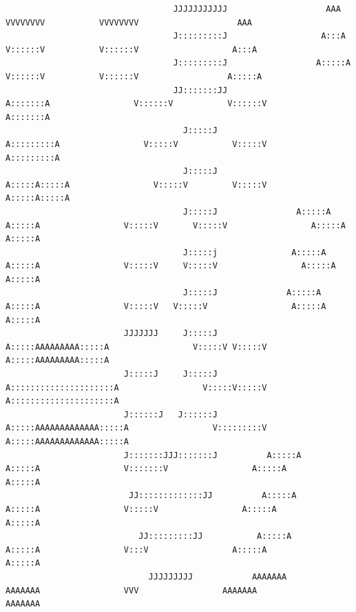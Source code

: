 \documentclass[openany]{book}  %
\begin{document}
\begin{titlepage}
{\begin{verbatim}
                                  JJJJJJJJJJJ                    AAA                    VVVVVVVV           VVVVVVVV                    AAA               
                                  J:::::::::J                   A:::A                   V::::::V           V::::::V                   A:::A              
                                  J:::::::::J                  A:::::A                  V::::::V           V::::::V                  A:::::A             
                                  JJ:::::::JJ                 A:::::::A                 V::::::V           V::::::V                 A:::::::A            
                                    J:::::J                  A:::::::::A                 V:::::V           V:::::V                 A:::::::::A           
                                    J:::::J                 A:::::A:::::A                 V:::::V         V:::::V                 A:::::A:::::A          
                                    J:::::J                A:::::A A:::::A                 V:::::V       V:::::V                 A:::::A A:::::A         
                                    J:::::j               A:::::A   A:::::A                 V:::::V     V:::::V                 A:::::A   A:::::A        
                                    J:::::J              A:::::A     A:::::A                 V:::::V   V:::::V                 A:::::A     A:::::A       
                        JJJJJJJ     J:::::J             A:::::AAAAAAAAA:::::A                 V:::::V V:::::V                 A:::::AAAAAAAAA:::::A      
                        J:::::J     J:::::J            A:::::::::::::::::::::A                 V:::::V:::::V                 A:::::::::::::::::::::A     
                        J::::::J   J::::::J           A:::::AAAAAAAAAAAAA:::::A                 V:::::::::V                 A:::::AAAAAAAAAAAAA:::::A    
                        J:::::::JJJ:::::::J          A:::::A             A:::::A                 V:::::::V                 A:::::A             A:::::A   
                         JJ:::::::::::::JJ          A:::::A               A:::::A                 V:::::V                 A:::::A               A:::::A  
                           JJ:::::::::JJ           A:::::A                 A:::::A                 V:::V                 A:::::A                 A:::::A 
                             JJJJJJJJJ            AAAAAAA                   AAAAAAA                 VVV                 AAAAAAA                   AAAAAAA
                                                                                                                                                 

\end{verbatim}}
\end{titlepage}
\end{document}
